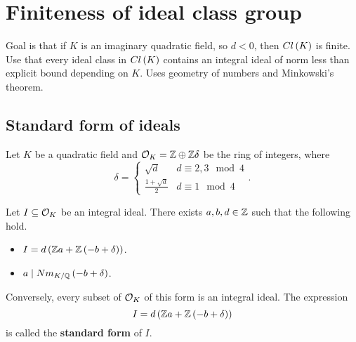 \section{Finiteness of ideal class group}

Goal is that if $ K $ is an imaginary quadratic field, so $ d < 0 $, then $ Cl\left( K \right) $ is finite. Use that every ideal class in $ Cl\left( K \right) $ contains an integral ideal of norm less than explicit bound depending on $ K $. Uses geometry of numbers and Minkowski's theorem.

\subsection{Standard form of ideals}

Let $ K $ be a quadratic field and $ \mathcal{O}_K = \mathbb{Z} \oplus \mathbb{Z}\delta $ be the ring of integers, where
$$ \delta =
\begin{cases}
\sqrt{d} & d \equiv 2, 3 \mod 4 \\
\tfrac{1 + \sqrt{d}}{2} & d \equiv 1 \mod 4
\end{cases}.
$$

\begin{proposition}
Let $ I \subseteq \mathcal{O}_K $ be an integral ideal. There exists $ a, b, d \in \mathbb{Z} $ such that the following hold.
\begin{itemize}
\item $ I = d\left( \mathbb{Z} a + \mathbb{Z}\left( -b + \delta \right) \right) $.
\item $ a \mid Nm_{K / \mathbb{Q}}\left( -b + \delta \right) $.
\end{itemize}
\end{proposition}

Conversely, every subset of $ \mathcal{O}_K $ of this form is an integral ideal. The expression
$$ I = d\left( \mathbb{Z} a + \mathbb{Z}\left( -b + \delta \right) \right) $$
is called the \textbf{standard form} of $ I $.

